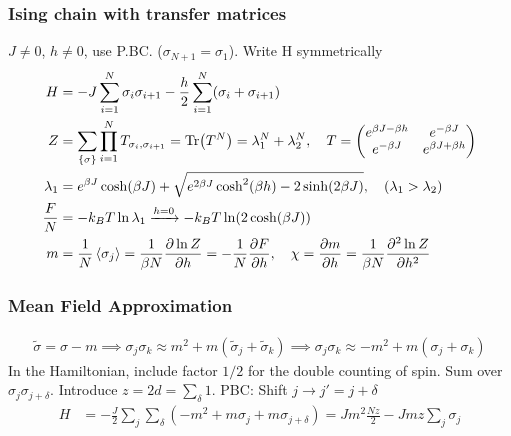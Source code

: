 \documentclass[a4paper, english, 12pt]{article}
\newcommand{\closed}[1]{\left( #1 \right)}
\newcommand{\curly}[1]{\{ #1 \} }
\begin{document}
\begin{multicols*}{2}
\subsubsection*{\scriptsize Ising chain with transfer matrices}
$J\neq0$, $h\neq0$, use P.BC. ($\sigma_{N+1}=\sigma_1$). Write H symmetrically 
\begin{align*}
    H &= -J\sum_{i=1}^N \sigma_i \sigma_{i+1} - \frac{h}{2}\sum_{i=1}^N (\sigma_i+\sigma_{i+1}) \\
    Z &= \sum_{\curly{\sigma}} \prod_{i=1}^N T_{\sigma_i,\sigma_{i+1}}=\Tr(T^N)=\lambda_1^N+\lambda_2^N,\quad T = \begin{pmatrix}
        e^{\beta J-\beta h} & e^{-\beta J} \\ 
        e^{-\beta J} & e^{\beta J + \beta h}
    \end{pmatrix} \\
    \lambda_1 &= e^{\beta J}\cosh(\beta J) + \sqrt{e^{2\beta J}\cosh^2(\beta h)-2\sinh(2\beta J) },\quad(\lambda_1>\lambda_2) \\ 
    \frac{F}{N} &=-k_B T \ln\lambda_1 \xrightarrow{h=0} -k_B T \ln(2\cosh(\beta J)) \\
    m &= \frac{1}{N} \expval{\sigma_j} = \frac{1}{\beta N} \pdv{\ln Z}{h} = -\frac{1}{N}\pdv{F}{h},\quad \chi = \pdv{m}{h} = \frac{1}{\beta N} \pdv[2]{\ln Z}{h}
\end{align*}



\subsubsection*{Mean Field Approximation}

\begin{align*}
    \tilde{\sigma}=\sigma-m\implies \sigma_j\sigma_k  \approx m^2 + m(\tilde{\sigma}_j + \tilde{\sigma}_k) \implies \sigma_j \sigma_k \approx -m^2 + m(\sigma_j + \sigma_k)
\end{align*}
In the Hamiltonian, include factor $1/2$ for the double counting of spin. Sum over $\sigma_j \sigma_{j+\delta}$. Introduce $z=2d=\sum_\delta 1$. PBC: Shift $j\to j'=j+\delta$ 
\begin{align*}
    H &= -\frac{J}{2}\sum_j \sum_\delta \closed{-m^2 + m\sigma_j + m\sigma_{j+\delta}} = Jm^2 \frac{Nz}{2} - J mz \sum_j \sigma_j
\end{align*}  


\end{multicols*}
\end{document}
